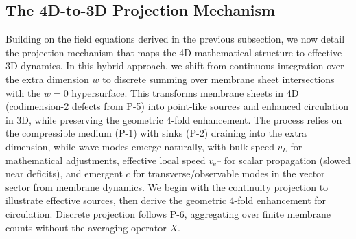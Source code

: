 \medskip
\noindent
{}
\medskip

\subsection{The 4D-to-3D Projection Mechanism}
\label{sec:projection}

Building on the field equations derived in the previous subsection, we now detail the projection mechanism that maps the 4D mathematical structure to effective 3D dynamics. In this hybrid approach, we shift from continuous integration over the extra dimension $w$ to discrete summing over membrane sheet intersections with the $w=0$ hypersurface. This transforms membrane sheets in 4D (codimension-2 defects from P-5) into point-like sources and enhanced circulation in 3D, while preserving the geometric 4-fold enhancement. The process relies on the compressible medium (P-1) with sinks (P-2) draining into the extra dimension, while wave modes emerge naturally, with bulk speed $v_L$ for mathematical adjustments, effective local speed $v_{\text{eff}}$ for scalar propagation (slowed near deficits), and emergent $c$ for transverse/observable modes in the vector sector from membrane dynamics. We begin with the continuity projection to illustrate effective sources, then derive the geometric 4-fold enhancement for circulation. Discrete projection follows P-6, aggregating over finite membrane counts without the averaging operator $\overline{X}$.

